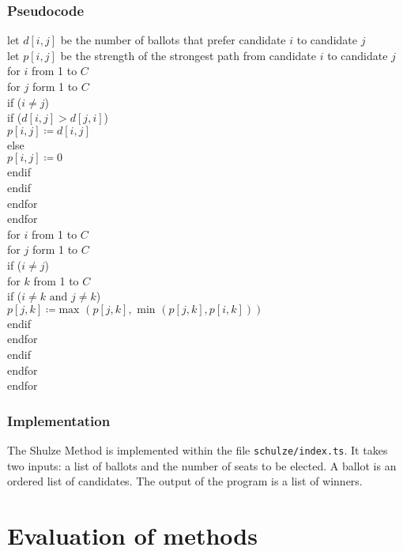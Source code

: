 \subsubsection{Pseudocode}
\label{Schulze psuedocode}
let $d[i,j]$ be the number of ballots that prefer candidate $i$ to candidate $j$\\
let $p[i,j]$ be the strength of the strongest path from candidate $i$ to candidate $j$\\
for $i$ from 1 to $C$\\
\tab for $j$ form 1 to $C$\\
\tab\tab if ($i \ne j$)\\
\tab\tab\tab if ($d[i,j] > d[j,i]$)\\
\tab\tab\tab\tab $p[i,j] \coloneqq d[i,j]$\\
\tab\tab\tab else\\
\tab\tab\tab\tab $p[i,j] \coloneqq 0$\\
\tab\tab\tab endif \\
\tab\tab endif \\
\tab endfor \\
endfor\\
for $i$ from 1 to $C$\\
\tab for $j$ form 1 to $C$\\
\tab\tab if ($i \ne j$)\\
\tab\tab\tab for $k$ from 1 to $C$\\
\tab\tab\tab\tab if ($i \ne k \text{ and } j \ne k$)\\
\tab\tab\tab\tab\tab $p[j,k] \coloneqq \text{max }(p[j,k], \text{ min }(p[j,k], p[i,k]))$\\
\tab\tab\tab\tab endif \\
\tab\tab\tab endfor \\
\tab\tab endif \\
\tab endfor \\
endfor\\
\subsubsection{Implementation}
The Shulze Method is implemented within the file \texttt{schulze/index.ts}. It takes two inputs: a list of ballots and the number of seats to be elected. A ballot is an ordered list of candidates. The output of the program is a list of winners.
\section{Evaluation of methods}
